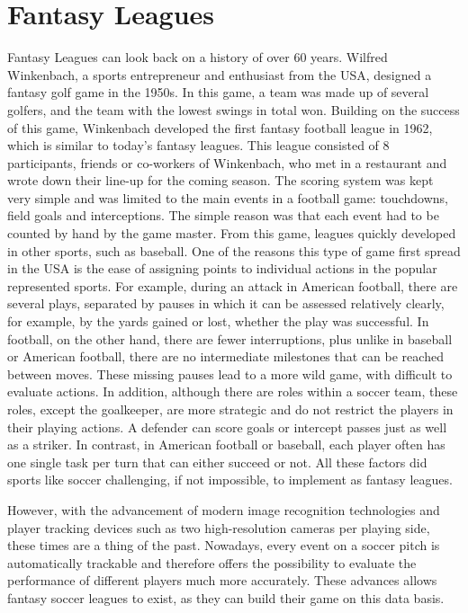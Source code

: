 \section{Fantasy Leagues}

Fantasy Leagues can look back on a history of over 60 years. Wilfred Winkenbach, a sports entrepreneur and enthusiast from the USA, designed a fantasy golf game in the 1950s. In this game, a team was made up of several golfers, and the team with the lowest swings in total won. Building on the success of this game, Winkenbach developed the first fantasy football league in 1962, which is similar to today's fantasy leagues. \parencite[cf.][]{green_wink_2014} This league consisted of 8 participants, friends or co-workers of Winkenbach, who met in a restaurant and wrote down their line-up for the coming season. The scoring system was kept very simple and was limited to the main events in a football game: touchdowns, field goals and interceptions. The simple reason was that each event had to be counted by hand by the game master. \parencite[cf.][]{fabiano_fantasy_2007} From this game, leagues quickly developed in other sports, such as baseball. One of the reasons this type of game first spread in the USA is the ease of assigning points to individual actions in the popular represented sports. For example, during an attack in American football, there are several plays, separated by pauses in which it can be assessed relatively clearly, for example, by the yards gained or lost, whether the play was successful. In football, on the other hand, there are fewer interruptions, plus unlike in baseball or American football, there are no intermediate milestones that can be reached between moves. These missing pauses lead to a more wild game, with difficult to evaluate actions. In addition, although there are roles within a soccer team, these roles, except the goalkeeper, are more strategic and do not restrict the players in their playing actions. A defender can score goals or intercept passes just as well as a striker. In contrast, in American football or baseball, each player often has one single task per turn that can either succeed or not. All these factors did sports like soccer challenging, if not impossible, to implement as fantasy leagues.

However, with the advancement of modern image recognition technologies and player tracking devices such as two high-resolution cameras per playing side, these times are a thing of the past. \parencite[cf.][]{hoffmann_millionen_2014} Nowadays, every event on a soccer pitch is automatically trackable and therefore offers the possibility to evaluate the performance of different players much more accurately. These advances allows fantasy soccer leagues to exist, as they can build their game on this data basis.

